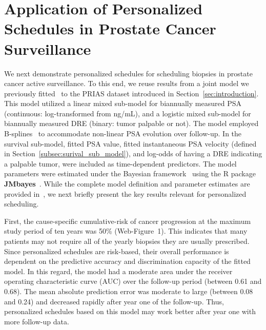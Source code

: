 \section{Application of Personalized Schedules in Prostate Cancer Surveillance}
\label{sec:results}
We next demonstrate personalized schedules for scheduling biopsies in prostate cancer active surveillance. To this end, we reuse results from a joint model we previously fitted~\citep{tomer2019personalized} to the PRIAS dataset introduced in Section~\ref{sec:introduction}. This model utilized a linear mixed sub-model for biannually measured PSA (continuous: log-transformed from ng/mL), and a logistic mixed sub-model for biannually measured DRE (binary: tumor palpable or not). The model employed B-splines~\citep{de1978practical} to accommodate non-linear PSA evolution over follow-up. In the survival sub-model, fitted PSA value, fitted instantaneous PSA velocity (defined in Section~\ref{subsec:surival_sub_model}), and log-odds of having a DRE indicating a palpable tumor, were included as time-dependent predictors. The model parameters were estimated under the Bayesian framework~\citep{tomer2019personalized} using the R package \textbf{JMbayes}~\citep{rizopoulosJMbayes}. While the complete model definition and parameter estimates are provided in~\citet{tomer2019personalized}, we next briefly present the key results relevant for personalized scheduling.

First, the cause-specific cumulative-risk of cancer progression at the maximum study period of ten years was 50\% (Web-Figure~1). This indicates that many patients may not require all of the yearly biopsies they are usually prescribed. Since personalized schedules are risk-based, their overall performance is dependent on the predictive accuracy and discrimination capacity of the fitted model. In this regard, the model had a moderate area under the receiver operating characteristic curve (AUC) over the follow-up period (between 0.61 and 0.68). The mean absolute prediction error was moderate to large (between 0.08 and 0.24) and decreased rapidly after year one of the follow-up. Thus, personalized schedules based on this model may work better after year one with more follow-up data.

